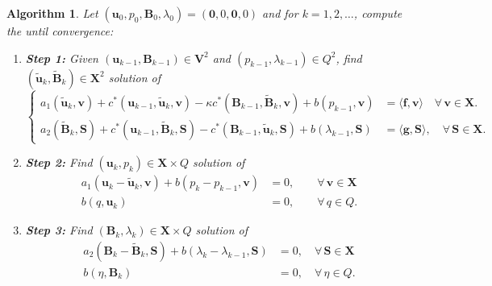 \documentclass[3p]{elsarticle}
\newtheorem{algorithm}{Algorithm}[section]
\def\V#1{\mathbf{#1}}
\def\Vt#1{\mathbf{\tilde{#1}}}
\def\VX{\mathbf{X}}
\begin{document}
\begin{algorithm}\label{algorithm:SIVS}
Let $(\V{u}_0,p_0,\V{B}_0,\lambda_0) = (\V{0},0,\V{0},0)$ and for $k = 1, 2, \ldots $, compute the until convergence: 
\begin{enumerate}
\item[]{\bf Step 1:} Given $(\V{u}_{k-1}, \V{B}_{k-1}) \in \V{V}^2 $ and $(p_{k-1}, \lambda_{k-1}) \in Q^2$, 
find $(\Vt{u}_{k},\Vt{B}_{k}) \in \VX^2$ solution of 
\begin{equation}
\label{eq:SIVS1}
\begin{cases}
a_1(\Vt{u}_{k}, \V{v})
+ c^*(\V{u}_{k-1}, \Vt{u}_{k}, \V{v})
- \kappa c^*(\V{B}_{k-1}, \Vt{B}_{k}, \V{v})
+ b(p_{k-1},\V{v}) &= \langle \V{f}, \V{v} \rangle \quad \forall \, \V{v} \in \VX.\\
a_2(\V{\tilde{B}}_{k}, \V{S})
+ c^*(\V{u}_{k-1}, \Vt{B}_{k},\V{S})
- c^*(\V{B}_{k-1}, \Vt{u}_{k},\V{S})
+ b(\lambda_{k-1},\V{S}) &= \langle \V{g}, \V{S} \rangle, \quad \forall \, \V{S} \in \VX.
\end{cases}
\end{equation}
\item[]{\bf Step 2:} Find $(\V{u}_{k}, p_{k}) \in \VX  \times Q$ solution of 
\begin{equation}
\label{eq:SIVS2}
\begin{aligned}
a_1(\V{u}_{k} - \Vt{u}_{k}, \V{v}) + 
  b(p_{k}-p_{k-1}, \V{v}) & = 0
, \qquad \forall \, \V{v} \in \VX
 \\
b(q,\V{u}_{k}) & = 0, \qquad \forall \, q \in Q.
\end{aligned}
\end{equation}
\item[]{\bf Step 3:} Find $(\V{B}_{k}, \lambda_{k})  \in \VX  \times Q$ solution of 
\begin{equation}
\label{eq:SIVS3}
\begin{aligned}
a_2( \V{B}_{k} -  \V{\tilde{B}}_{k}, \V{S})
+ b(\lambda_{k}-\lambda_{k-1}, \V{S}) & = 0,
\quad \forall \, \V{S} \in \VX 
 \\
b(\eta, \V{B}_{k}) & = 0, \quad \forall \, \eta \in Q.
\end{aligned}
\end{equation}
\end{enumerate}
\end{algorithm}
\end{document}
